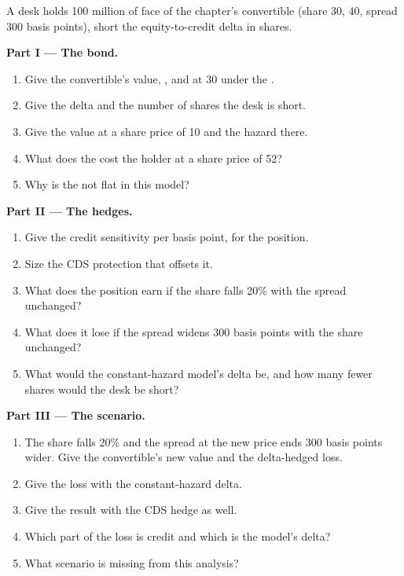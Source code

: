 \begin{problem}\label{pb:dv:convertibles-and-the-credit-equity-link:1}
A desk holds 100 million of face of the chapter's convertible (share 30,  40, spread 300 basis points), short the equity-to-credit
delta in shares.

\medskip\noindent\textbf{Part I --- The bond.}
\begin{enumerate}
\item Give the convertible's value, ,  and  at 30 under the .
\item Give the delta and the number of shares the desk is short.
\item Give the value at a share price of 10 and the hazard there.
\item What does the  cost the holder at a share price of 52?
\item Why is the  not flat in this model?
\end{enumerate}

\medskip\noindent\textbf{Part II --- The hedges.}
\begin{enumerate}[resume]
\item Give the credit sensitivity per basis point, for the position.
\item Size the CDS protection that offsets it.
\item What does the position earn if the share falls 20\% with the spread unchanged?
\item What does it lose if the spread widens 300 basis points with the share unchanged?
\item What would the constant-hazard model's delta be, and how many fewer shares would the desk be short?
\end{enumerate}

\medskip\noindent\textbf{Part III --- The scenario.}
\begin{enumerate}[resume]
\item The share falls 20\% and the spread at the new price ends 300 basis points wider. Give the convertible's new value and the delta-hedged loss.
\item Give the loss with the constant-hazard delta.
\item Give the result with the CDS hedge as well.
\item Which part of the loss is credit and which is the model's delta?
\item What scenario is missing from this analysis?
\end{enumerate}


\end{problem}
